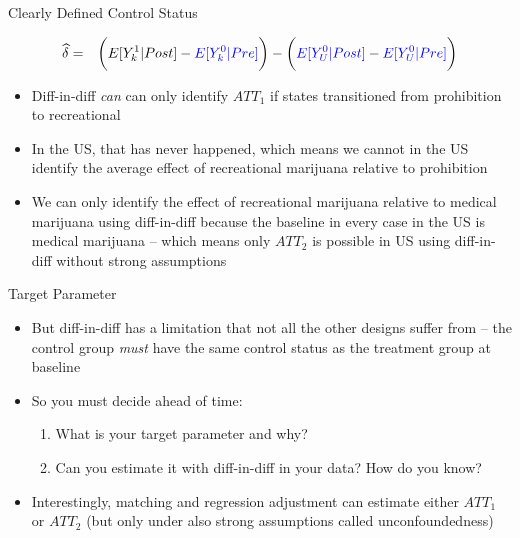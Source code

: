 \documentclass{beamer}
\begin{document}
\begin{frame}{Clearly Defined Control Status}

\begin{eqnarray*}
\widehat{\delta} &=& \bigg ( E[Y^1_k|Post] - \textcolor{blue}{E[Y^0_k|Pre]} \bigg ) - \bigg ( \textcolor{blue}{E[Y^0_U | Post ]} - \textcolor{blue}{E[ Y^0_U | Pre]} \bigg) \\
\end{eqnarray*}

\begin{itemize}
\item Diff-in-diff \emph{can} can only identify $ATT_1$ if states transitioned from prohibition to recreational
\pause
\item In the US, that has never happened, which means we cannot in the US identify the average effect of recreational marijuana relative to prohibition
\pause
\item We can only identify the effect of recreational marijuana relative to medical marijuana using diff-in-diff because the baseline in every case in the US is medical marijuana -- which means only $ATT_2$ is possible in US using diff-in-diff without strong assumptions
\end{itemize}

\end{frame}


\begin{frame}{Target Parameter}

\begin{itemize}
\item But diff-in-diff has a limitation that not all the other designs suffer from -- the control group \emph{must} have the same control status as the treatment group at baseline
\item So you must decide ahead of time:
	\begin{enumerate}
	\item What is your target parameter and why?
	\item Can you estimate it with diff-in-diff in your data?  How do you know?
	\end{enumerate}
\item Interestingly, matching and regression adjustment can estimate either $ATT_1$ or $ATT_2$ (but only under also strong assumptions called unconfoundedness)
\end{itemize}

\end{frame}
\end{document}
